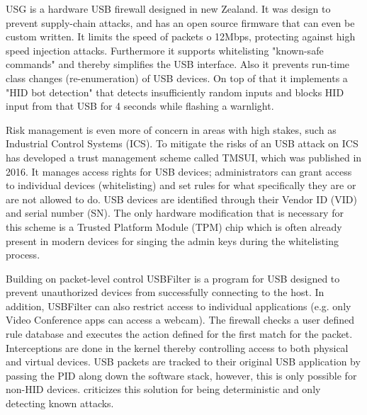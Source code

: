 USG \cite{robertfiskRobertfiskUSG2016} is a hardware USB firewall designed in new Zealand. It was design to prevent supply-chain attacks, and has an open source firmware that can even be custom written. It limits the speed of packets o 12Mbps, protecting against high speed injection attacks. Furthermore it supports whitelisting "known-safe commands" and thereby simplifies the USB interface. Also it prevents run-time class changes (re-enumeration) of USB devices. On top of that it implements a "HID bot detection" that detects insufficiently random inputs and blocks HID input from that USB for 4 seconds while flashing a warnlight. 

Risk management is even more of concern in areas with high stakes, such as Industrial Control Systems (ICS). To mitigate the risks of an USB attack on ICS \cite{yangTMSUITrustManagement2016} has developed a trust management scheme called TMSUI, which was published in 2016. It manages access rights for USB devices; administrators can grant access to individual devices (whitelisting) and set rules for what specifically they are or are not allowed to do. USB devices are identified through their Vendor ID (VID) and serial number (SN). The only hardware modification that is necessary for this scheme is a Trusted Platform Module (TPM) chip which is often already present in modern devices for singing the admin keys during the whitelisting process.

Building on packet-level control USBFilter \cite{tianMakingUSBGreat2016} is a program for USB designed to prevent unauthorized devices from successfully connecting to the host. In addition, USBFilter can also restrict access to individual applications (e.g. only Video Conference apps can access a webcam). The firewall checks a user defined rule database and executes the action defined for the first match for the packet. Interceptions are done in the kernel thereby controlling access to both physical and virtual devices. USB packets are tracked to their original USB application by passing the PID along down the software stack, however, this is only possible for non-HID devices.
\cite{nissimUSBbasedAttacks2017} criticizes this solution for being deterministic and only detecting known attacks. 

